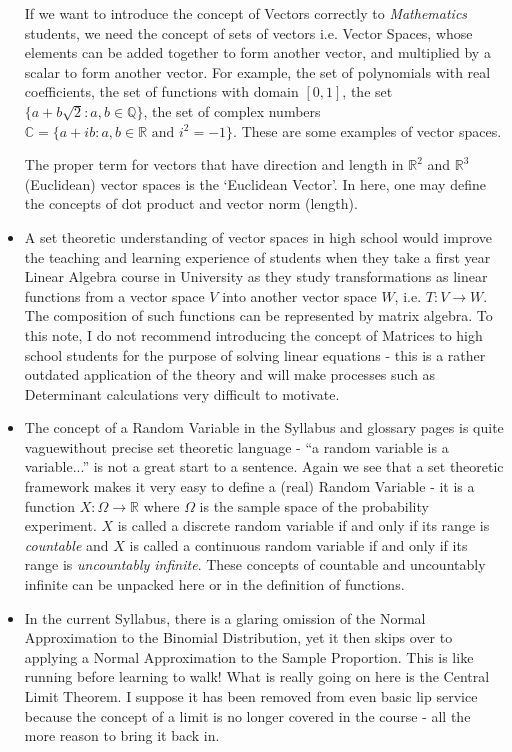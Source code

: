 \documentclass[11pt, a4paper, oneside]{article}
\begin{document}
\begin{itemize}
    If we want to introduce the concept of Vectors correctly to \emph{Mathematics} students, we need the concept of sets of vectors i.e. Vector Spaces, whose elements can be added together to form another vector, and multiplied by a scalar to form another vector. For example, the set of polynomials with real coefficients, the set of functions with domain $[0,1]$, the set $\{ a + b \sqrt{2} : a,b \in \mathbb{Q} \}$, the set of complex numbers $\mathbb{C} = \{ a + ib : a, b \in \mathbb{R} \mbox{ and } i^2 = -1 \}$. These are some examples of vector spaces.

    The proper term for vectors that have direction and length in $\mathbb{R}^2$ and $\mathbb{R}^3$ (Euclidean) vector spaces is the `Euclidean Vector'. In here, one may define the concepts of dot product and vector norm (length).

  \item A set theoretic understanding of vector spaces in high school would improve the teaching and learning experience of students when they take a first year Linear Algebra course in University as they study transformations as linear functions from a vector space $V$ into another vector space $W$, i.e. $T: V \rightarrow W$. The composition of such functions can be represented by matrix algebra. To this note, I do not recommend introducing the concept of Matrices to high school students for the purpose of solving linear equations - this is a rather outdated application of the theory and will make processes such as Determinant calculations very difficult to motivate.

  \item The concept of a Random Variable in the Syllabus and glossary pages is quite vaguewithout precise set theoretic language - ``a random variable is a variable...'' is not a great start to a sentence. Again we see that a set theoretic framework makes it very easy to define a (real) Random Variable - it is a function $X: \Omega \rightarrow \mathbb{R}$ where $\Omega$ is the sample space of the probability experiment. $X$ is called a discrete random variable if and only if its range is \emph{countable} and $X$ is called a continuous random variable if and only if its range is \emph{uncountably infinite}. These concepts of countable and uncountably infinite can be unpacked here or in the definition of functions.

  \item In the current Syllabus, there is a glaring omission of the Normal Approximation to the Binomial Distribution, yet it then skips over to applying a Normal Approximation to the Sample Proportion. This is like running before learning to walk! What is really going on here is the Central Limit Theorem. I suppose it has been removed from even basic lip service because the concept of a limit is no longer covered in the course - all the more reason to bring it back in.


\end{itemize}
\end{document}
